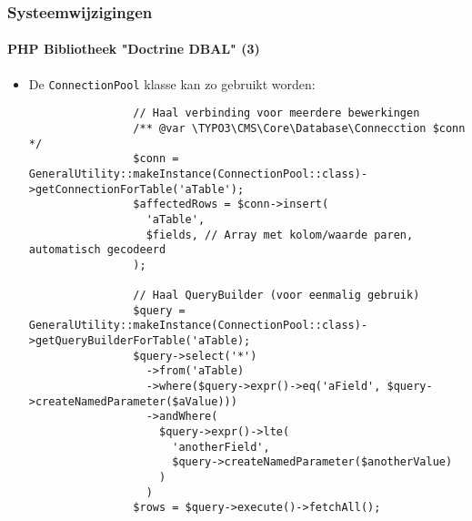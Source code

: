 \begin{frame}[fragile]
	\frametitle{Systeemwijzigingen}
	\framesubtitle{PHP Bibliotheek "Doctrine DBAL" (3)}

	\lstset{basicstyle=\tiny\ttfamily}

	\begin{itemize}

		\item De \texttt{ConnectionPool} klasse kan zo gebruikt worden:
			\begin{lstlisting}
				// Haal verbinding voor meerdere bewerkingen
				/** @var \TYPO3\CMS\Core\Database\Connecction $conn */
				$conn = GeneralUtility::makeInstance(ConnectionPool::class)->getConnectionForTable('aTable');
				$affectedRows = $conn->insert(
				  'aTable',
				  $fields, // Array met kolom/waarde paren, automatisch gecodeerd
				);

				// Haal QueryBuilder (voor eenmalig gebruik)
				$query = GeneralUtility::makeInstance(ConnectionPool::class)->getQueryBuilderForTable('aTable);
				$query->select('*')
				  ->from('aTable)
				  ->where($query->expr()->eq('aField', $query->createNamedParameter($aValue)))
				  ->andWhere(
					$query->expr()->lte(
					  'anotherField',
					  $query->createNamedParameter($anotherValue)
					)
				  )
				$rows = $query->execute()->fetchAll();
			\end{lstlisting}
	\end{itemize}

\end{frame}

